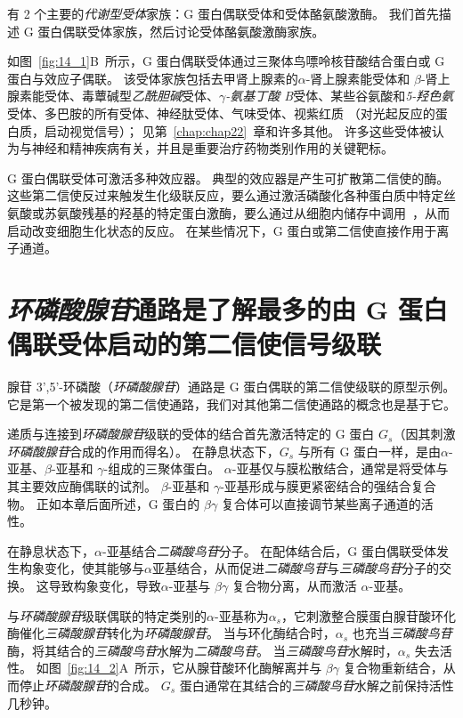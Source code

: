 有 2 个主要的\textit{代谢型受体}家族：G 蛋白偶联受体和受体酪氨酸激酶。
我们首先描述 G 蛋白偶联受体家族，然后讨论受体酪氨酸激酶家族。


如图~\ref{fig:14_1}B~所示，G 蛋白偶联受体通过三聚体鸟嘌呤核苷酸结合蛋白或 G 蛋白与效应子偶联。
该受体家族包括去甲肾上腺素的$\alpha$-肾上腺素能受体和 $\beta$-肾上腺素能受体、毒蕈碱型\textit{乙酰胆碱}受体、\textit{$\gamma$-氨基丁酸 B}受体、某些谷氨酸和\textit{5-羟色氨}受体、多巴胺的所有受体、神经肽受体、气味受体、视紫红质 （对光起反应的蛋白质，启动视觉信号）；
见第~\ref{chap:chap22}~章和许多其他。
许多这些受体被认为与神经和精神疾病有关，并且是重要治疗药物类别作用的关键靶标。


G 蛋白偶联受体可激活多种效应器。
典型的效应器是产生可扩散第二信使的酶。
这些第二信使反过来触发生化级联反应，要么通过激活磷酸化各种蛋白质中特定丝氨酸或苏氨酸残基的羟基的特定蛋白激酶，要么通过从细胞内储存中调用~，从而启动改变细胞生化状态的反应。
在某些情况下，G 蛋白或第二信使直接作用于离子通道。



\section{\textit{环磷酸腺苷}通路是了解最多的由 G 蛋白偶联受体启动的第二信使信号级联}

腺苷 3',5'-环磷酸（\textit{环磷酸腺苷}）通路是 G 蛋白偶联的第二信使级联的原型示例。
它是第一个被发现的第二信使通路，我们对其他第二信使通路的概念也是基于它。


递质与连接到\textit{环磷酸腺苷}级联的受体的结合首先激活特定的 G 蛋白 $ G_s $（因其刺激\textit{环磷酸腺苷}合成的作用而得名）。
在静息状态下，$ G_s $ 与所有 G 蛋白一样，是由$\alpha$-亚基、$\beta$-亚基和 $\gamma$-组成的三聚体蛋白。
$\alpha$-亚基仅与膜松散结合，通常是将受体与其主要效应酶偶联的试剂。
$\beta$-亚基和 $\gamma$-亚基形成与膜更紧密结合的强结合复合物。
正如本章后面所述，G 蛋白的 $\beta \gamma$ 复合体可以直接调节某些离子通道的活性。


在静息状态下，$\alpha$-亚基结合\textit{二磷酸鸟苷}分子。
在配体结合后，G 蛋白偶联受体发生构象变化，使其能够与$\alpha$亚基结合，从而促进\textit{二磷酸鸟苷}与\textit{三磷酸鸟苷}分子的交换。
这导致构象变化，导致$\alpha$-亚基与 $\beta \gamma$ 复合物分离，从而激活 $\alpha$-亚基。


与\textit{环磷酸腺苷}级联偶联的特定类别的$\alpha$-亚基称为$\alpha_s$，它刺激整合膜蛋白腺苷酸环化酶催化\textit{三磷酸腺苷}转化为\textit{环磷酸腺苷}。
当与环化酶结合时，$\alpha_s$ 也充当\textit{三磷酸鸟苷}酶，将其结合的\textit{三磷酸鸟苷}水解为\textit{二磷酸鸟苷}。
当\textit{三磷酸鸟苷}水解时，$\alpha_s$ 失去活性。
如图~\ref{fig:14_2}A~所示，它从腺苷酸环化酶解离并与 $\beta \gamma$ 复合物重新结合，从而停止\textit{环磷酸腺苷}的合成。
$ G_s $ 蛋白通常在其结合的\textit{三磷酸鸟苷}水解之前保持活性几秒钟。


